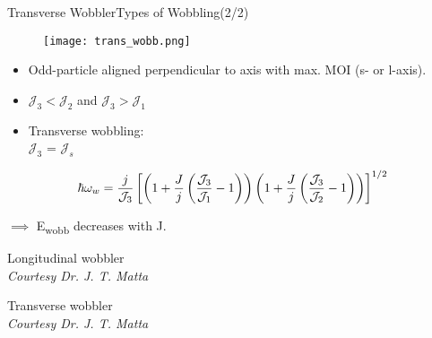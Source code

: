 \documentclass [11pt]{beamer}
\begin{document}
\begin{frame}{Transverse Wobbler}{Types of Wobbling(2/2)}
\begin{multicols}{2}
\begin{figure}
\begin{center}
\texttt{[image: trans\_wobb.png]}
\end{center}
\end{figure}
\begin{itemize}
\item{Odd-particle aligned perpendicular to axis with max. MOI (s- or l-axis).}
\item{$\mathcal{J}_{3} < \mathcal{J}_{2}$ and $\mathcal{J}_{3} > \mathcal{J}_{1}$}
\item{Transverse wobbling: \\ $\mathcal{J}_{3}$ = $\mathcal{J}_{s}$} 
\end{itemize}
\end{multicols}
\begin{align*}
\begin{centering}
\hbar \omega_{w} = \frac{j}{\mathcal{J}_{3}} \left[\left(1+ \frac{J}{j} \left( \frac{\mathcal{J}_{3}}{\mathcal{J}_{1}} -1 \right) \right) \left( 1+ \frac{J}{j} \left( \frac{\mathcal{J}_{3}}{\mathcal{J}_{2}} -1 \right)\right)\right]^{1/2}
\end{centering}
\end{align*}

$\implies$ E\textsubscript{wobb} decreases with J.
\begin{center}
\end{center}
\end{frame}

\begin{frame}{Longitudinal wobbler}
	\centering 
{}
\\\tiny{\textit{Courtesy Dr. J. T. Matta}}  
\end{frame} 

\begin{frame}{Transverse wobbler}
	\centering 
{} 
\\\tiny{\textit{Courtesy Dr. J. T. Matta}}
\end{frame} 
\end{document}
